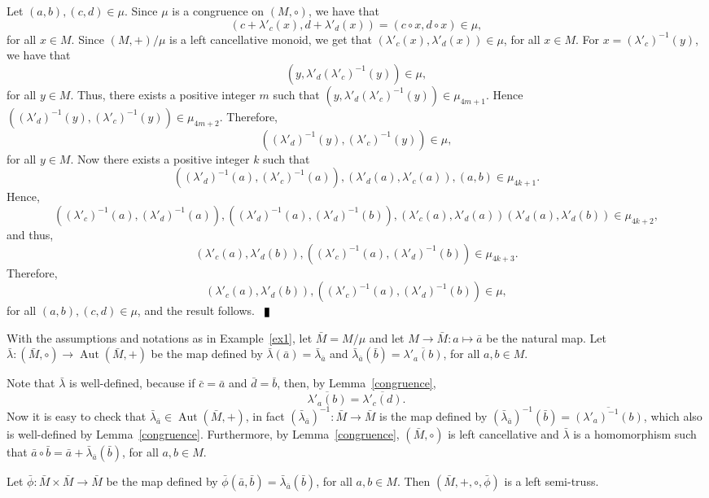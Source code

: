 \documentclass[10pt]{article}
\newcommand{\Aut}{\operatorname{Aut}}
\newenvironment{proof}{\par\noindent{\bf Proof.}}{$\qed$\par\bigskip}
\newcommand{\qed}{\enspace\vrule  height6pt  width4pt  depth2pt}
\begin{document}
\begin{proof}
	
	Let $(a,b),(c,d)\in \mu$. Since $\mu$ is a congruence on $(M,\circ)$, we have that 
	$$(c+\lambda'_c(x),d+\lambda'_d(x))=(c\circ x, d\circ x)\in \mu,$$
	for all $x\in M$.
	Since $(M,+)/\mu$ is a left cancellative monoid, we get that $(\lambda'_c(x),\lambda'_d(x))\in \mu$, for all $x\in M$. For $x=(\lambda'_c)^{-1}(y)$, we have that
	$$(y,\lambda'_d(\lambda'_c)^{-1}(y))\in \mu,$$ 
	for all $y\in M$. Thus, there exists a positive integer $m$ such that $(y,\lambda'_d(\lambda'_c)^{-1}(y))\in \mu_{4m+1}$. Hence
	$((\lambda'_d)^{-1}(y),(\lambda'_c)^{-1}(y))\in \mu_{4m+2}$. Therefore,
	$$((\lambda'_d)^{-1}(y),(\lambda'_c)^{-1}(y))\in \mu,$$ 
	for all $y\in M$. Now there exists a positive integer $k$ such that
	$$((\lambda'_d)^{-1}(a),(\lambda'_c)^{-1}(a)), (\lambda'_d(a),\lambda'_c(a)), (a,b)\in \mu_{4k+1}.$$
	Hence,
	$$((\lambda'_c)^{-1}(a),(\lambda'_d)^{-1}(a)), ((\lambda'_d)^{-1}(a),(\lambda'_d)^{-1}(b)), (\lambda'_c(a),\lambda'_d(a)) (\lambda'_d(a),\lambda'_d(b))\in \mu_{4k+2},$$
	and thus,
	$$(\lambda'_c(a),\lambda'_d(b)),((\lambda'_c)^{-1}(a),(\lambda'_d)^{-1}(b))\in \mu_{4k+3}.$$
	Therefore,
	$$(\lambda'_c(a),\lambda'_d(b)),((\lambda'_c)^{-1}(a),(\lambda'_d)^{-1}(b))\in \mu,$$
	for all $(a,b),(c,d)\in \mu$, and the result follows.
\end{proof}



With the assumptions and notations as in  Example~\ref{ex1},  let $\bar
M=M/\mu$ and let $ M\longrightarrow \bar M: a\mapsto \overline{a}$ be
the natural  map. Let $\bar\lambda\colon (\bar
M,\circ)\longrightarrow \Aut(\bar M,+)$ be the map defined by
$\bar\lambda(\bar a)=\bar\lambda_{\bar a}$ and $\bar\lambda_{\bar
	a}(\bar b)=\overline{\lambda'_a(b)}$, for all $a,b\in M$.


Note that $\bar\lambda$ is well-defined, because if $\bar c=\bar a$
and $\bar d=\bar b$, then, by Lemma~\ref{congruence},
$$\overline{\lambda'_a(b)}=\overline{\lambda'_c(d)}.$$
Now it is easy to check that $\bar\lambda_{\bar a}\in \Aut(\bar
M,+)$, in fact $(\bar\lambda_{\bar a})^{-1}\colon \bar M\longrightarrow \bar M$ is the map defined by $(\bar\lambda_{\bar a})^{-1}(\bar b)=\overline{(\lambda'_a)^{-1}(b)}$, which also  is well-defined by Lemma~\ref{congruence}. Furthermore, by Lemma~\ref{congruence}, $(\bar M,\circ)$ is left cancellative and $\bar\lambda$ is a homomorphism such that $\bar
a\circ\bar b=\bar a+\bar\lambda_{\bar a}(\bar b)$, for all $a,b\in
M$. 

Let $\bar \phi\colon \bar M\times\bar M\longrightarrow \bar M$ be
the map defined by $\bar\phi(\bar a,\bar b)=\bar\lambda_{\bar
	a}(\bar b)$, for all $a,b\in M$. Then $(\bar M,+,\circ,\bar \phi)$
is a left semi-truss.
\end{document}
